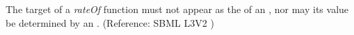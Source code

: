 The target of a \emph{rateOf}  function must not appear as the  of an \AssignmentRule, nor may its value be determined by an \AlgebraicRule.  (Reference: SBML L3V2 )
